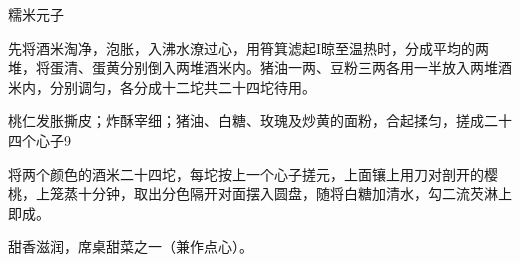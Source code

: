 \begin{recipe}[原珍珠元子]{糯米元子}

\ingredients


\cooking

\step 先将酒米淘净，泡胀，入沸水潦过心，用筲箕滤起I晾至温热时，分成平均的两堆，将蛋清、蛋黄分别倒入两堆酒米内。猪油一两、豆粉三两各用一半放入两堆酒米内，分别调匀，各分成十二坨共二十四坨待用。

\step 桃仁发胀撕皮；炸酥宰细；猪油、白糖、玫瑰及炒黄的面粉，合起揉匀，搓成二十四个心子9

\step 将两个颜色的酒米二十四坨，每坨按上一个心子搓元，上面镶上用刀对剖开的樱桃，上笼蒸十分钟，取出分色隔开对面摆入圆盘，随将白糖加清水，勾二流芡淋上即成。

\notes

甜香滋润，席桌甜菜之一（兼作点心）。

\end{recipe}

